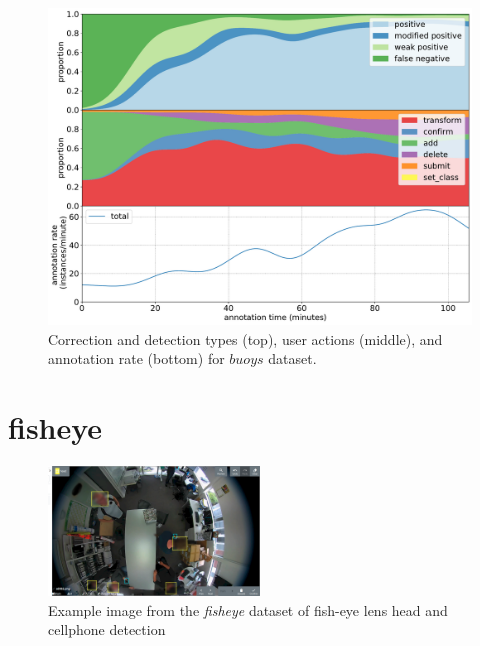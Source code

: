\begin{figure}[!h]
\centering
\includegraphics[width=1.0\linewidth]{charts/action_annotations/buoys.pdf}
\caption{Correction and detection types (top), user actions (middle), and annotation rate (bottom) for $buoys$ dataset.}
\label{fig:buoys_annotation}
\end{figure}

\pagebreak
\section{fisheye}
\label{sec:fisheye_details}


\begin{figure}[H]
\begin{center}
  \includegraphics[width=0.5\textwidth]{figures/annotation/screenshots/victor.png}
\end{center}
  \caption{Example image from the \emph{fisheye} dataset of fish-eye lens head and cellphone detection }
\end{figure}

